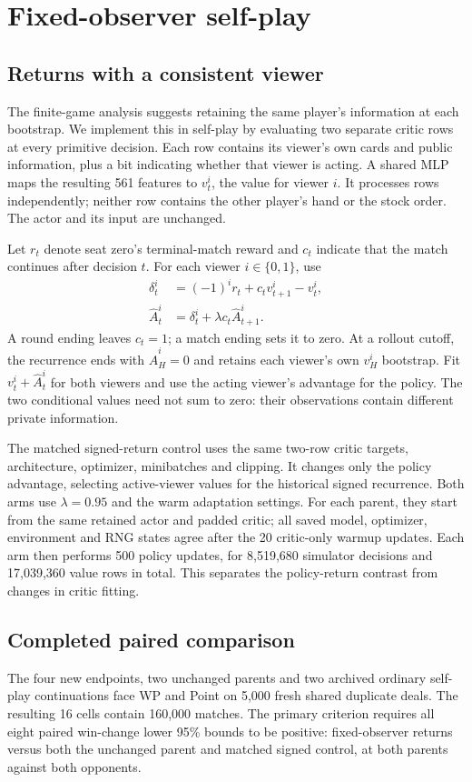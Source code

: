 \documentclass[11pt]{article}
\begin{document}
\section{Fixed-observer self-play}
\label{sec:observer-selfplay}
\subsection{Returns with a consistent viewer}
The finite-game analysis suggests retaining the same player's information at
each bootstrap. We implement this in self-play by evaluating two separate
critic rows at every primitive decision. Each row contains its viewer's own
cards and public information, plus a bit indicating whether that viewer is
acting. A shared MLP maps the resulting 561 features to $v_t^i$, the value for
viewer $i$. It processes rows independently; neither row contains the other
player's hand or the stock order. The actor and its input are unchanged.

Let $r_t$ denote seat zero's terminal-match reward and $c_t$ indicate that the
match continues after decision $t$. For each viewer $i\in\{0,1\}$, use
\begin{align}
 \delta_t^i &= (-1)^i r_t+c_t v_{t+1}^i-v_t^i,\\
 \widehat A_t^i &= \delta_t^i+\lambda c_t\widehat A_{t+1}^i.
\end{align}
A round ending leaves $c_t=1$; a match ending sets it to zero. At a rollout
cutoff, the recurrence ends with $\widehat A_H^i=0$ and retains each viewer's
own $v_H^i$ bootstrap. Fit $v_t^i+\widehat A_t^i$ for both viewers and use the
acting viewer's advantage for the policy. The two conditional values need not
sum to zero: their observations contain different private information.

The matched signed-return control uses the same two-row critic targets,
architecture, optimizer, minibatches and clipping. It changes only the policy
advantage, selecting active-viewer values for the historical signed recurrence.
Both arms use $\lambda=0.95$ and the warm adaptation settings. For each parent,
they start from the same retained actor and padded critic; all saved model,
optimizer, environment and RNG states agree after the 20
critic-only warmup updates. Each arm then performs 500 policy updates, for
8,519,680 simulator decisions and 17,039,360 value rows in total. This separates
the policy-return contrast from changes in critic fitting.

\subsection{Completed paired comparison}
The four new endpoints, two unchanged parents and two archived ordinary
self-play continuations face WP and Point on 5,000 fresh shared duplicate
deals. The resulting 16 cells contain 160,000 matches. The primary criterion
requires all eight paired win-change lower 95\% bounds to be positive:
fixed-observer returns versus both the unchanged parent and matched signed
control, at both parents against both opponents.
\end{document}
